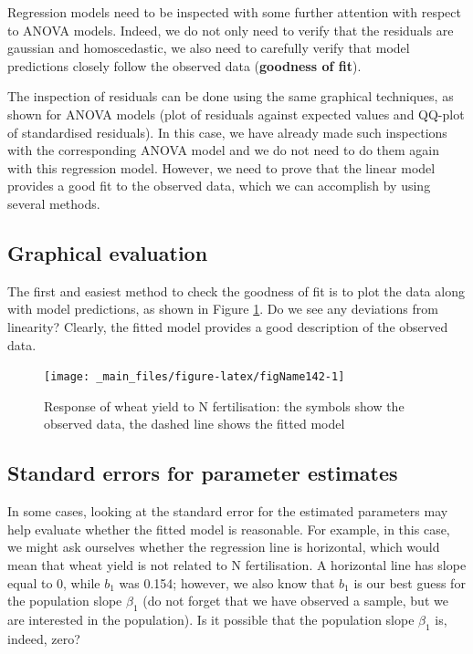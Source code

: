 \documentclass[a4paper,12pt,oneside]{book}
\begin{document}
Regression models need to be inspected with some further attention with respect to ANOVA models. Indeed, we do not only need to verify that the residuals are gaussian and homoscedastic, we also need to carefully verify that model predictions closely follow the observed data (\textbf{goodness of fit}).

The inspection of residuals can be done using the same graphical techniques, as shown for ANOVA models (plot of residuals against expected values and QQ-plot of standardised residuals). In this case, we have already made such inspections with the corresponding ANOVA model and we do not need to do them again with this regression model. However, we need to prove that the linear model provides a good fit to the observed data, which we can accomplish by using several methods.

\hypertarget{graphical-evaluation}{%
\subsection{Graphical evaluation}\label{graphical-evaluation}}

The first and easiest method to check the goodness of fit is to plot the data along with model predictions, as shown in Figure \ref{fig:figName142}. Do we see any deviations from linearity? Clearly, the fitted model provides a good description of the observed data.

\begin{figure}

{\centering \texttt{[image: \_main\_files/figure-latex/figName142-1]} 

}

\caption{Response of wheat yield to N fertilisation: the symbols show the observed data, the dashed line shows the fitted model}\label{fig:figName142}
\end{figure}

\hypertarget{standard-errors-for-parameter-estimates}{%
\subsection{Standard errors for parameter estimates}\label{standard-errors-for-parameter-estimates}}

In some cases, looking at the standard error for the estimated parameters may help evaluate whether the fitted model is reasonable. For example, in this case, we might ask ourselves whether the regression line is horizontal, which would mean that wheat yield is not related to N fertilisation. A horizontal line has slope equal to 0, while \(b_1\) was 0.154; however, we also know that \(b_1\) is our best guess for the population slope \(\beta_1\) (do not forget that we have observed a sample, but we are interested in the population). Is it possible that the population slope \(\beta_1\) is, indeed, zero?
\end{document}
